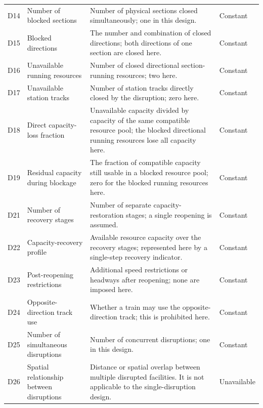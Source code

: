 \begin{longtable}{@{}>{\raggedright\arraybackslash}p{0.7cm}>{\raggedright\arraybackslash}p{3.0cm}>{\raggedright\arraybackslash}p{8.6cm}>{\raggedright\arraybackslash}p{1.9cm}@{}}
D14 & Number of blocked sections & Number of physical sections closed simultaneously; one in this design. & Constant \\

D15 & Blocked directions & The number and combination of closed directions; both directions of one section are closed here. & Constant \\

D16 & Unavailable running resources & Number of closed directional section-running resources; two here. & Constant \\

D17 & Unavailable station tracks & Number of station tracks directly closed by the disruption; zero here. & Constant \\

D18 & Direct capacity-loss fraction & Unavailable capacity divided by capacity of the same compatible resource pool; the blocked directional running resources lose all capacity here. & Constant \\

D19 & Residual capacity during blockage & The fraction of compatible capacity still usable in a blocked resource pool; zero for the blocked running resources here. & Constant \\

D21 & Number of recovery stages & Number of separate capacity-restoration stages; a single reopening is assumed. & Constant \\

D22 & Capacity-recovery profile & Available resource capacity over the recovery stages; represented here by a single-step recovery indicator. & Constant \\

D23 & Post-reopening restrictions & Additional speed restrictions or headways after reopening; none are imposed here. & Constant \\

D24 & Opposite-direction track use & Whether a train may use the opposite-direction track; this is prohibited here. & Constant \\

D25 & Number of simultaneous disruptions & Number of concurrent disruptions; one in this design. & Constant \\

D26 & Spatial relationship between disruptions & Distance or spatial overlap between multiple disrupted facilities. It is not applicable to the single-disruption design. & Unavailable \\


\end{longtable}
